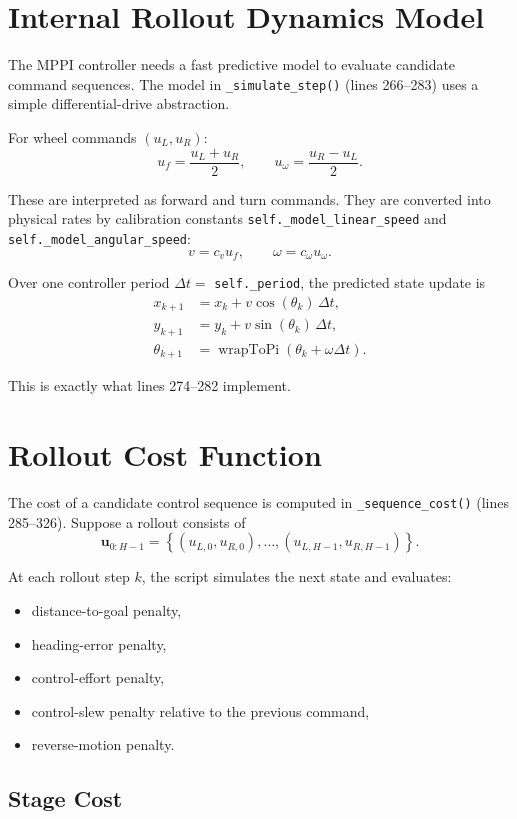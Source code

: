 \documentclass[11pt]{article}
\begin{document}
\section{Internal Rollout Dynamics Model}

The MPPI controller needs a fast predictive model to evaluate candidate command
sequences. The model in \texttt{\_simulate\_step()} (lines 266--283) uses a
simple differential-drive abstraction.

For wheel commands $(u_L, u_R)$:
\[
u_f = \frac{u_L + u_R}{2},
\qquad
u_\omega = \frac{u_R - u_L}{2}.
\]

These are interpreted as forward and turn commands. They are converted into
physical rates by calibration constants
\texttt{self.\_model\_linear\_speed} and
\texttt{self.\_model\_angular\_speed}:
\[
v = c_v u_f,
\qquad
\omega = c_\omega u_\omega.
\]

Over one controller period $\Delta t =$ \texttt{self.\_period}, the predicted
state update is
\begin{align*}
x_{k+1} &= x_k + v \cos(\theta_k)\,\Delta t, \\
y_{k+1} &= y_k + v \sin(\theta_k)\,\Delta t, \\
\theta_{k+1} &= \operatorname{wrapToPi}(\theta_k + \omega \Delta t).
\end{align*}

This is exactly what lines 274--282 implement.

\section{Rollout Cost Function}

The cost of a candidate control sequence is computed in
\texttt{\_sequence\_cost()} (lines 285--326). Suppose a rollout consists of
\[
\mathbf{u}_{0:H-1} = \left\{(u_{L,0},u_{R,0}), \dots, (u_{L,H-1},u_{R,H-1})\right\}.
\]

At each rollout step $k$, the script simulates the next state and evaluates:
\begin{itemize}
\item distance-to-goal penalty,
\item heading-error penalty,
\item control-effort penalty,
\item control-slew penalty relative to the previous command,
\item reverse-motion penalty.
\end{itemize}

\subsection{Stage Cost}
\end{document}
